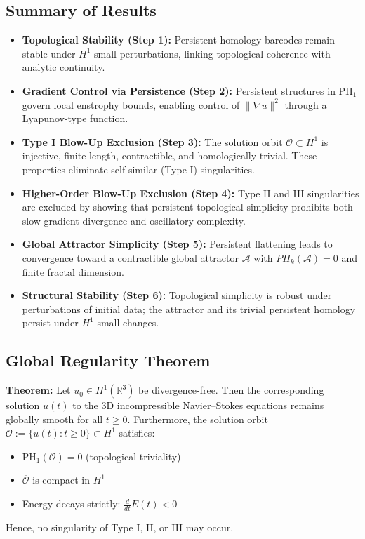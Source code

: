 \documentclass[11pt]{article}
\theoremstyle{definition}
\begin{document}
\subsection*{Summary of Results}
\begin{itemize}
  \item \textbf{Topological Stability (Step 1):} Persistent homology barcodes remain stable under $H^1$-small perturbations, linking topological coherence with analytic continuity.
  \item \textbf{Gradient Control via Persistence (Step 2):} Persistent structures in $\mathrm{PH}_1$ govern local enstrophy bounds, enabling control of $\|\nabla u\|^2$ through a Lyapunov-type function.
  \item \textbf{Type I Blow-Up Exclusion (Step 3):} The solution orbit $\mathcal{O} \subset H^1$ is injective, finite-length, contractible, and homologically trivial. These properties eliminate self-similar (Type I) singularities.
  \item \textbf{Higher-Order Blow-Up Exclusion (Step 4):} Type II and III singularities are excluded by showing that persistent topological simplicity prohibits both slow-gradient divergence and oscillatory complexity.
  \item \textbf{Global Attractor Simplicity (Step 5):} Persistent flattening leads to convergence toward a contractible global attractor $\mathcal{A}$ with $PH_k(\mathcal{A}) = 0$ and finite fractal dimension.
  \item \textbf{Structural Stability (Step 6):} Topological simplicity is robust under perturbations of initial data; the attractor and its trivial persistent homology persist under $H^1$-small changes.
\end{itemize}

\subsection*{Global Regularity Theorem}
\textbf{Theorem:} Let $u_0 \in H^1(\mathbb{R}^3)$ be divergence-free. Then the corresponding solution $u(t)$ to the 3D incompressible Navier--Stokes equations remains globally smooth for all $t \ge 0$. Furthermore, the solution orbit $\mathcal{O} := \{ u(t) : t \ge 0 \} \subset H^1$ satisfies:
\begin{itemize}
  \item $\mathrm{PH}_1(\mathcal{O}) = 0$ \quad (topological triviality)
  \item $\overline{\mathcal{O}}$ is compact in $H^1$
  \item Energy decays strictly: $\frac{d}{dt} E(t) < 0$
\end{itemize}
\noindent Hence, no singularity of Type I, II, or III may occur.
\end{document}
